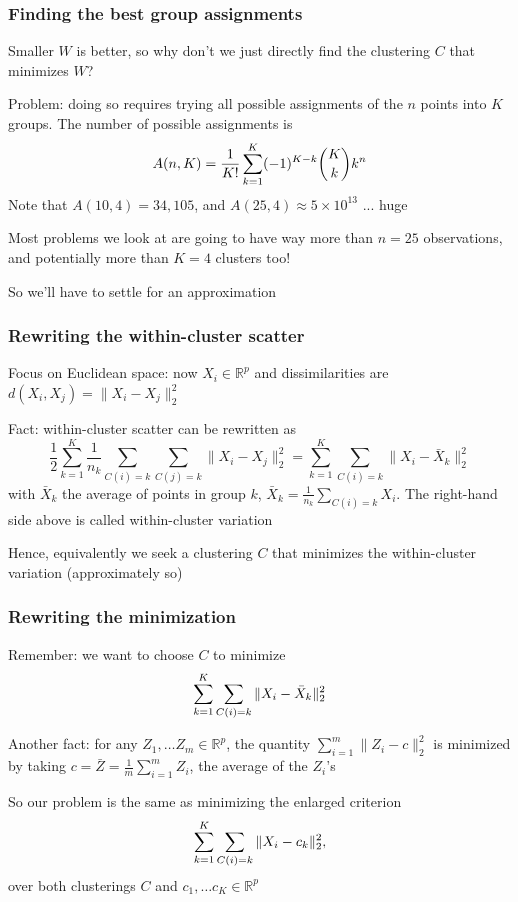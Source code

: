 \documentclass[mathserif]{beamer}
\def\half{\frac{1}{2}}
\def\R{\mathds{R}}
\def\blue{\color[rgb]{0,0,0.8}}
\begin{document}
\begin{frame}
\frametitle{Finding the best group assignments}
Smaller $W$ is better, so why don't we just directly
find the clustering $C$ that {\blue minimizes $W$}?

\bigskip
Problem: doing so requires trying 
{\blue all possible assignments} of the $n$ points into
$K$ groups. The number of possible assignments is
\vspace{-5pt}
$$A(n,K) = \frac{1}{K!}\sum_{k=1}^K (-1)^{K-k} 
{K \choose k} k^n
\vspace{-5pt}$$
Note that $A(10,4)=34,105$, and
$A(25,4) \approx 5 \times 10^{13}$ ... huge

\bigskip
Most problems we look at are going to have way 
more than $n=25$ observations, and potentially more
than $K=4$ clusters too! 

\bigskip
So we'll have to settle for an {\blue approximation}
\end{frame}

\begin{frame}
\frametitle{Rewriting the within-cluster scatter}
Focus on Euclidean space: now $X_i \in \R^p$ and
dissimilarities are $d(X_i,X_j)=\|X_i-X_j\|_2^2$

\bigskip
Fact: within-cluster scatter can
be rewritten as
$$\half\sum_{k=1}^K \frac{1}{n_k} \sum_{C(i)=k} 
\sum_{C(j)=k} \|X_i-X_j\|_2^2 = 
\sum_{k=1}^K \sum_{C(i)=k} \|X_i-\bar{X}_k\|_2^2$$
with $\bar{X}_k$ the average of points
in group $k$,  
$\bar{X}_k = \frac{1}{n_k} \sum_{C(i)=k} X_i$.
The right-hand side above is called
{\blue within-cluster variation}

\bigskip
Hence, equivalently we seek 
a clustering $C$ that minimizes
the within-cluster variation (approximately so)
\end{frame}

\begin{frame}
\frametitle{Rewriting the minimization}
Remember: we want to choose $C$ to minimize
\vspace{-5pt}
$$\sum_{k=1}^K \sum_{C(i)=k} \|X_i-\bar{X}_k\|_2^2
\vspace{-5pt}$$

\bigskip
Another fact: for any $Z_1,\ldots Z_m \in \R^p$, the 
quantity $\sum_{i=1}^m \|Z_i-c\|_2^2$ is minimized by 
taking 
$c=\bar{Z}=\frac{1}{m} \sum_{i=1}^m Z_i$, the average
of the $Z_i$'s

\bigskip
So our problem is the same as minimizing the 
{\blue enlarged criterion}
\vspace{-5pt}
$$\sum_{k=1}^K \sum_{C(i)=k} \|X_i-c_k\|_2^2,
\vspace{-5pt}$$
over both clusterings $C$ and $c_1,\ldots c_K\in\R^p$
\end{frame}
\end{document}
